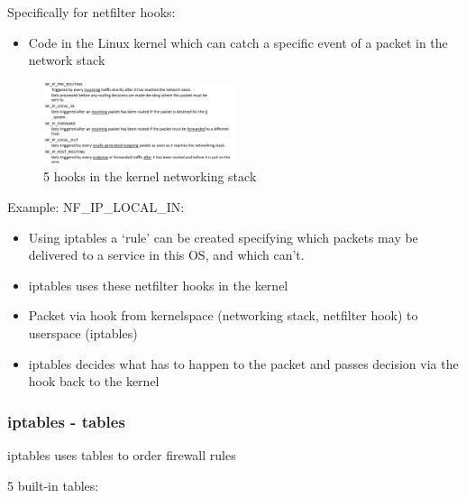 \documentclass{article}
\begin{document}
Specifically for netfilter hooks:

\begin{itemize}
    \item Code in the Linux kernel which can catch a specific event of a packet in the network stack
\end{itemize}

\begin{figure}[H]
    \centering
    \includegraphics[width=0.5\textwidth]{hooks.png}
    \caption{5 hooks in the kernel networking stack}
\end{figure}

Example: NF\_IP\_LOCAL\_IN:

\begin{itemize}
    \item Using iptables a `rule' can be created specifying which packets may be delivered to a service in this OS, and which can't.
    \item iptables uses these netfilter hooks in the kernel
    \item Packet via hook from kernelspace (networking stack, netfilter hook) to userspace (iptables)
    \item iptables decides what has to happen to the packet and passes decision via the hook back to the kernel
\end{itemize}

\subsubsection{iptables - tables}

iptables uses tables to order firewall rules

5 built-in tables:
\end{document}
